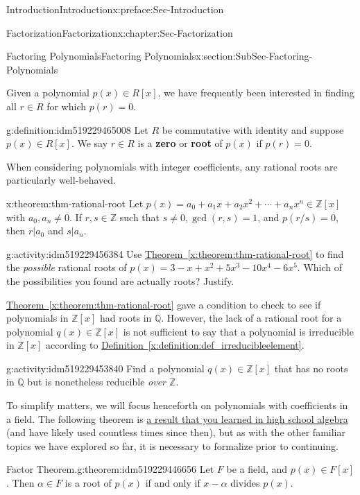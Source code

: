 \documentclass[oneside,10pt,]{book}
\newcommand{\xreffont}{\relax}
\newcommand{\terminology}[1]{\textbf{#1}}
\numberwithin{equation}{section}
\def\Z{{\mathbb Z}}
\def\Q{{\mathbb Q}}
\begin{document}
\begin{preface}{Introduction}{}{Introduction}{}{}{x:preface:Sec-Introduction}
\begin{chapterptx}{Factorization}{}{Factorization}{}{}{x:chapter:Sec-Factorization}
\begin{sectionptx}{Factoring Polynomials}{}{Factoring Polynomials}{}{}{x:section:SubSec-Factoring-Polynomials}
\par
Given a polynomial \(p(x)\in R[x]\), we have frequently been interested in finding all \(r\in R\) for which \(p(r) = 0\).%
\begin{definition}{}{g:definition:idm519229465008}%
%
%
Let \(R\) be commutative with identity and suppose \(p(x) \in R[x]\). We say \(r\in R\) is a \terminology{zero} or \terminology{root} of \(p(x)\) if \(p(r) = 0\).%
\end{definition}
When considering polynomials with integer coefficients, any rational roots are particularly well-behaved.%
\begin{theorem}{}{}{x:theorem:thm-rational-root}%
Let \(p(x) = a_0 + a_1 x + a_2 x^2 + \cdots + a_n x^n \in \Z[x]\) with \(a_0,a_n\ne 0\). If \(r,s\in\Z\) such that \(s\ne 0, \gcd(r,s)=1\), and \(p(r/s)=0\), then \(r|a_0\) and \(s|a_n\).%
\end{theorem}
\begin{activity}{}{g:activity:idm519229456384}%
Use \hyperref[x:theorem:thm-rational-root]{Theorem~{\xreffont\ref{x:theorem:thm-rational-root}}} to find the \emph{possible} rational roots of \(p(x) = 3 - x + x^2 + 5x^3 - 10x^4 - 6x^5\). Which of the possibilities you found are actually roots? Justify.%
\end{activity}
\hyperref[x:theorem:thm-rational-root]{Theorem~{\xreffont\ref{x:theorem:thm-rational-root}}} gave a condition to check to see if polynomials in \(\Z[x]\) had roots in \(\Q\). However, the lack of a rational root for a polynomial \(q(x)\in \Z[x]\) is not sufficient to say that a polynomial is irreducible in \(\Z[x]\) according to \hyperref[x:definition:def_irreducibleelement]{Definition~{\xreffont\ref{x:definition:def_irreducibleelement}}}.%
\begin{activity}{}{g:activity:idm519229453840}%
Find a polynomial \(q(x) \in \Z[x]\) that has no roots in \(\Q\) but is nonetheless reducible \emph{over \(\Z\)}.%
\end{activity}
To simplify matters, we will focus henceforth on polynomials with coefficients in a field. The following theorem is \href{http://www.corestandards.org/Math/Content/HSA/APR/B/2/}{a result that you learned in high school algebra} (and have likely used countless times since then), but as with the other familiar topics we have explored so far, it is necessary to formalize prior to continuing.%
\begin{theorem}{Factor Theorem.}{}{g:theorem:idm519229446656}%
Let \(F\) be a field, and \(p(x)\in F[x]\). Then \(\alpha\in F\) is a root of \(p(x)\) if and only if \(x-\alpha\) divides \(p(x)\).%

\end{theorem}
\end{sectionptx}
\end{chapterptx}
\end{preface}
\end{document}
